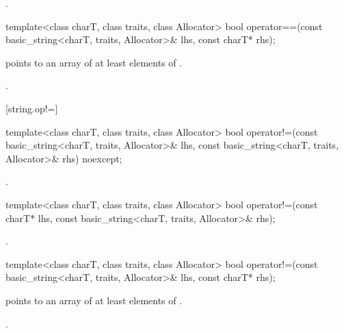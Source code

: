 \begin{itemdescr}
\pnum
\returns
{}.
\end{itemdescr}

%
\begin{itemdecl}
template<class charT, class traits, class Allocator>
  bool operator==(const basic_string<charT, traits, Allocator>& lhs,
                  const charT* rhs);
\end{itemdecl}

\begin{itemdescr}
\pnum
\requires {} points to an array of at least 
elements of .

\pnum
\returns
{}.
\end{itemdescr}

[string.op!=]{}

%
\begin{itemdecl}
template<class charT, class traits, class Allocator>
  bool operator!=(const basic_string<charT, traits, Allocator>& lhs,
                  const basic_string<charT, traits, Allocator>& rhs) noexcept;
\end{itemdecl}

\begin{itemdescr}
\pnum
\returns
{}.
\end{itemdescr}

%
\begin{itemdecl}
template<class charT, class traits, class Allocator>
  bool operator!=(const charT* lhs,
                  const basic_string<charT, traits, Allocator>& rhs);
\end{itemdecl}

\begin{itemdescr}
\pnum
\returns
{}.
\end{itemdescr}

%
\begin{itemdecl}
template<class charT, class traits, class Allocator>
  bool operator!=(const basic_string<charT, traits, Allocator>& lhs,
                  const charT* rhs);
\end{itemdecl}

\begin{itemdescr}
\pnum
\requires {} points to an array of at least 
elements of .

\pnum
\returns
{}.
\end{itemdescr}

